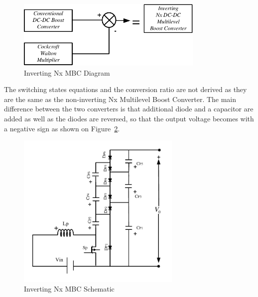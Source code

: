 \begin{figure}[H]
   \centering
   \includegraphics[width=0.8\textwidth]{figures/yMultilevel/InvertingNxDiagram.pdf}
    \caption{Inverting Nx MBC Diagram}
	\label{fig:MBC_CW_CBCtoINx}
\end{figure}
\vspace{-4mm}
The switching states equations and the conversion ratio are not derived as they are the same as the non-inverting Nx Multilevel Boost Converter. The main difference between the two converters is that additional diode and a capacitor are added as well as the diodes are reversed, so that the output voltage becomes with a negative sign as shown on Figure~\ref{fig:MBC_InvertingNx}.
\vspace{-4mm}
\begin{figure}[H]
   \centering
   \includegraphics[width=0.7\textwidth]{figures/yMultilevel/InvertingMBCforReport2.pdf}
    \caption{Inverting Nx MBC Schematic}
	\label{fig:MBC_InvertingNx}
\end{figure}


